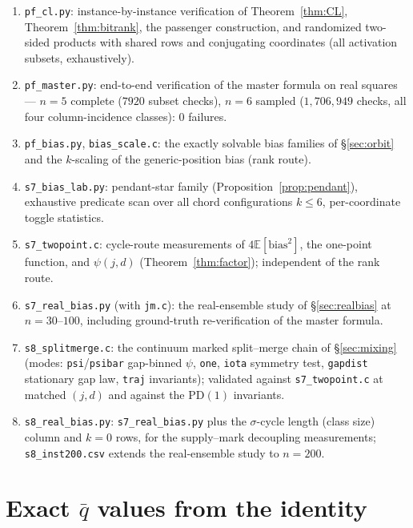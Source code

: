 \documentclass[11pt]{article}
\theoremstyle{definition}
\newcommand{\E}{\mathbb{E}}
\newcommand{\CC}{C}
\begin{document}
\begin{enumerate}[leftmargin=2em]
$|X_A|,|X_B|$ for all types and merges --- by complete enumeration of
first-row-normalised squares ($n\le6$), and per fixed representative
$\sigma_0$ of each type ($n=7$; conjugation symmetry); exact match
with $2\CC_n(\lambda)/\CC_n(\mu)-1$ in all cases.
\item \texttt{pf\_cl.py}: instance-by-instance verification of
Theorem~\ref{thm:CL}, Theorem~\ref{thm:bitrank}, the passenger
construction, and randomized two-sided products with shared rows and
conjugating coordinates (all activation subsets, exhaustively).
\item \texttt{pf\_master.py}: end-to-end verification of the master
formula on real squares --- $n=5$ complete ($7920$ subset checks),
$n=6$ sampled ($1{,}706{,}949$ checks, all four column-incidence
classes): $0$ failures.
\item \texttt{pf\_bias.py}, \texttt{bias\_scale.c}: the exactly
solvable bias families of \S\ref{sec:orbit} and the $k$-scaling of
the generic-position bias (rank route).
\item \texttt{s7\_bias\_lab.py}: pendant-star family
(Proposition~\ref{prop:pendant}), exhaustive predicate scan over all
chord configurations $k\le6$, per-coordinate toggle statistics.
\item \texttt{s7\_twopoint.c}: cycle-route measurements of
$4\E[\mathrm{bias}^2]$, the one-point function, and $\psi(j,d)$
(Theorem~\ref{thm:factor}); independent of the rank route.
\item \texttt{s7\_real\_bias.py} (with \texttt{jm.c}): the
real-ensemble study of \S\ref{sec:realbias} at $n=30$--$100$,
including ground-truth re-verification of the master formula.
\item \texttt{s8\_splitmerge.c}: the continuum marked split--merge
chain of \S\ref{sec:mixing} (modes: \texttt{psi}/\texttt{psibar}
gap-binned $\psi$, \texttt{one}, \texttt{iota} symmetry test,
\texttt{gapdist} stationary gap law, \texttt{traj} invariants);
validated against \texttt{s7\_twopoint.c} at matched $(j,d)$ and
against the $\mathrm{PD}(1)$ invariants.
\item \texttt{s8\_real\_bias.py}: \texttt{s7\_real\_bias.py} plus the
$\sigma$-cycle length (class size) column and $k=0$ rows, for the
supply--mark decoupling measurements; \texttt{s8\_inst200.csv} extends
the real-ensemble study to $n=200$.
\end{enumerate}

\section{Exact \texorpdfstring{$\bar q$}{qbar} values from the identity}\label{app:qbar}
\end{document}
